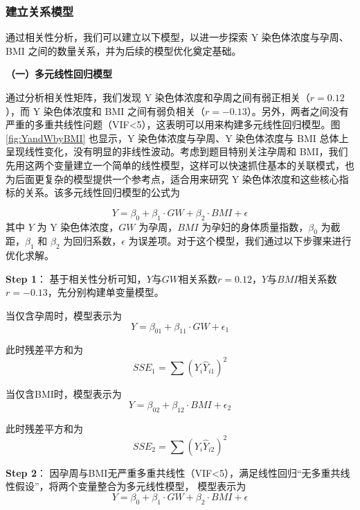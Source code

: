 \documentclass[withoutpreface,bwprint]{cumcmthesis} %
\begin{document}
\subsubsection{建立关系模型}
通过相关性分析，我们可以建立以下模型，以进一步探索 Y 染色体浓度与孕周、BMI 之间的数量关系，并为后续的模型优化奠定基础。

\textbf{（一）多元线性回归模型}

通过分析相关性矩阵，我们发现 Y 染色体浓度和孕周之间有弱正相关（$r=0.12$），而 Y 染色体浓度和 BMI 之间有弱负相关（$r=-0.13$）。另外，两者之间没有严重的多重共线性问题（VIF<5），这表明可以用来构建多元线性回归模型。图 \ref{fig:YandWbyBMI} 也显示，Y 染色体浓度与孕周、Y 染色体浓度与 BMI 总体上呈现线性变化，没有明显的非线性波动。考虑到题目特别关注孕周和 BMI，我们先用这两个变量建立一个简单的线性模型，这样可以快速抓住基本的关联模式，也为后面更复杂的模型提供一个参考点，适合用来研究 Y 染色体浓度和这些核心指标的关系。该多元线性回归模型的公式为

\begin{equation}
    Y = \beta_0 + \beta_1 \cdot GW + \beta_2 \cdot BMI + \epsilon
\end{equation}
其中 $Y$ 为 Y 染色体浓度，$GW$ 为孕周，$BMI$ 为孕妇的身体质量指数，$\beta_0$ 为截距，$\beta_1$ 和 $\beta_2$ 为回归系数，$\epsilon$ 为误差项。对于这个模型，我们通过以下步骤来进行优化求解。

\textbf{Step 1}： 
基于相关性分析可知，$Y$与$GW$相关系数$r=0.12$，$Y$与$BMI$相关系数$r=-0.13$，先分别构建单变量模型。

当仅含孕周时，模型表示为
\begin{equation}
    Y = \beta_{01} + \beta_{11} \cdot GW + \epsilon_1
\end{equation}

此时残差平方和为
\begin{equation}
    SSE_1 = \sum (Y_i \hat{Y}_{i1})^2
\end{equation}

当仅含BMI时，模型表示为
\begin{equation}
    Y = \beta_{02} + \beta_{12} \cdot BMI + \epsilon_2
\end{equation}

此时残差平方和为
\begin{equation}
    SSE_2 = \sum (Y_i \hat{Y}_{i2})^2
\end{equation}
    
\textbf{Step 2}：
因孕周与BMI无严重多重共线性（VIF<5），满足线性回归“无多重共线性假设”，将两个变量整合为多元线性模型，
模型表示为
\begin{equation}
    Y = \beta_0 + \beta_1 \cdot GW + \beta_2 \cdot BMI + \epsilon
\end{equation}
\end{document}
